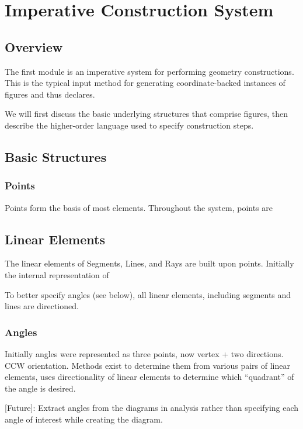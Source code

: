 \chapter{Imperative Construction System}
\label{chap:imperative}

\section{Overview}

The first module is an imperative system for performing geometry
constructions. This is the typical input method for generating
coordinate-backed instances of figures and thus declares.

We will first discuss the basic underlying structures that comprise
figures, then describe the higher-order language used to specify
construction steps.

\section{Basic Structures}

\subsection{Points}

Points form the basis of most elements. Throughout the system, points
are

\section{Linear Elements}

The linear elements of Segments, Lines, and Rays are built upon
points. Initially the internal representation of

To better specify angles (see below), all linear elements, including
segments and lines are directioned.

\subsection{Angles}

Initially angles were represented as three points, now vertex + two
directions. CCW orientation. Methods exist to determine them from
various pairs of linear elements, uses directionality of linear
elements to determine which ``quadrant'' of the angle is desired.

[Future]: Extract angles from the diagrams in analysis rather than
specifying each angle of interest while creating the diagram.

